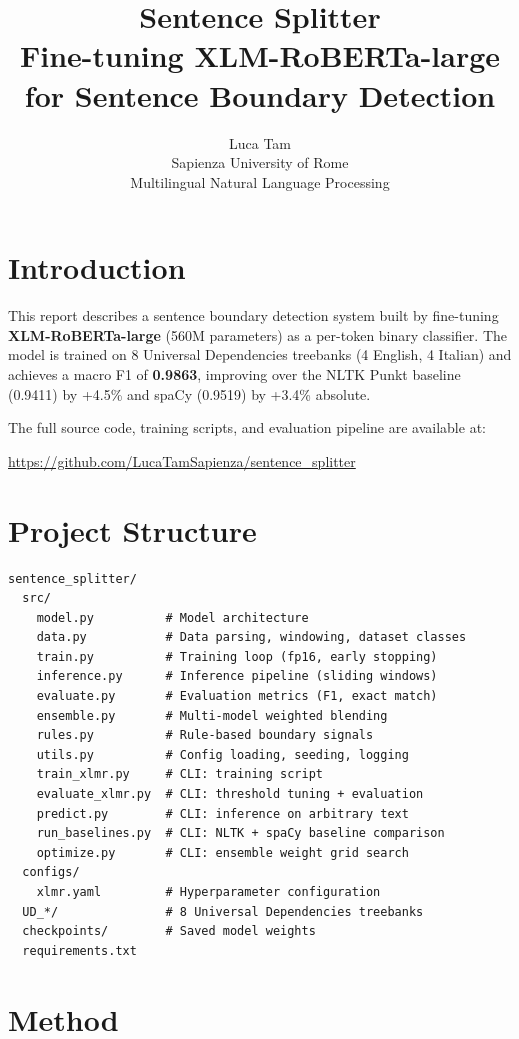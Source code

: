 \documentclass[11pt,a4paper]{article}
\title{\textbf{Sentence Splitter}\\[4pt]
\large Fine-tuning XLM-RoBERTa-large for Sentence Boundary Detection}
\author{Luca Tam\\
\small Sapienza University of Rome\\
\small Multilingual Natural Language Processing}
\date{}
\begin{document}
\maketitle

\section{Introduction}

This report describes a sentence boundary detection system built by fine-tuning
\textbf{XLM-RoBERTa-large} (560M parameters) as a per-token binary classifier.
The model is trained on 8 Universal Dependencies treebanks (4 English, 4 Italian)
and achieves a macro F1 of \textbf{0.9863}, improving over the NLTK Punkt
baseline (0.9411) by +4.5\% and spaCy (0.9519) by +3.4\% absolute.

The full source code, training scripts, and evaluation pipeline are available at:

\begin{center}
\url{https://github.com/LucaTamSapienza/sentence_splitter}
\end{center}

\section{Project Structure}

\begin{lstlisting}
sentence_splitter/
  src/
    model.py          # Model architecture
    data.py           # Data parsing, windowing, dataset classes
    train.py          # Training loop (fp16, early stopping)
    inference.py      # Inference pipeline (sliding windows)
    evaluate.py       # Evaluation metrics (F1, exact match)
    ensemble.py       # Multi-model weighted blending
    rules.py          # Rule-based boundary signals
    utils.py          # Config loading, seeding, logging
    train_xlmr.py     # CLI: training script
    evaluate_xlmr.py  # CLI: threshold tuning + evaluation
    predict.py        # CLI: inference on arbitrary text
    run_baselines.py  # CLI: NLTK + spaCy baseline comparison
    optimize.py       # CLI: ensemble weight grid search
  configs/
    xlmr.yaml         # Hyperparameter configuration
  UD_*/               # 8 Universal Dependencies treebanks
  checkpoints/        # Saved model weights
  requirements.txt
\end{lstlisting}

\section{Method}
\end{document}
